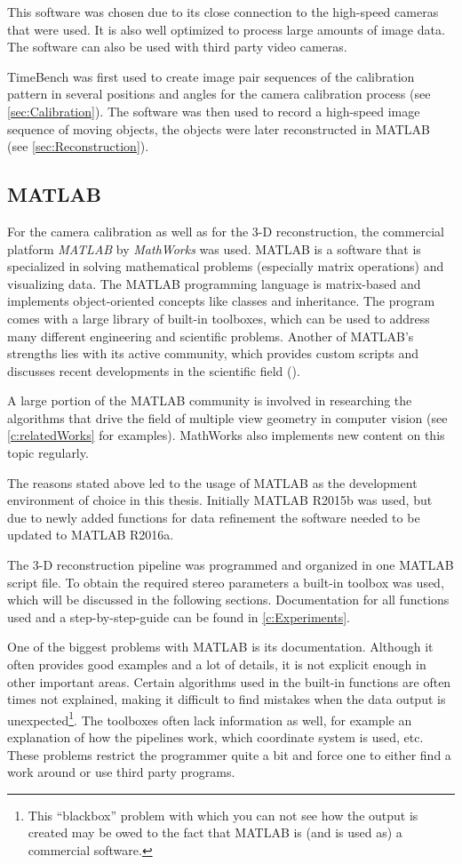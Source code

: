 This software was chosen due to its close connection to the high-speed cameras that were used. It is also well optimized to process large amounts of image data. The software can also be used with third party video cameras.

TimeBench was first used to create image pair sequences of the calibration pattern in several positions and angles for the camera calibration process (see \autoref{sec:Calibration}). The software was then used to record a high-speed image sequence of moving objects, the objects were later reconstructed in MATLAB (see \autoref{sec:Reconstruction}). 

\subsection{MATLAB} \label{ssec:Matlab}
For the camera calibration as well as for the 3-D reconstruction, the commercial platform \textit{MATLAB} by \textit{MathWorks} was used. MATLAB is a software that is specialized in solving mathematical problems (especially matrix operations) and visualizing data. The MATLAB programming language is matrix-based and implements object-oriented concepts like classes and inheritance. The program comes with a large library of built-in toolboxes, which can be used to address many different engineering and scientific problems. Another of MATLAB's strengths lies with its active community, which provides custom scripts and discusses recent developments in the scientific field (\cite{MathWorks.2016}).

A large portion of the MATLAB community is involved in researching the algorithms that drive the field of multiple view geometry in computer vision (see \autoref{c:relatedWorks} for examples). MathWorks also implements new content on this topic regularly. 

The reasons stated above led to the usage of MATLAB as the development environment of choice in this thesis. Initially MATLAB R2015b was used, but due to newly added functions for data refinement the software needed to be updated to MATLAB R2016a.
   
The 3-D reconstruction pipeline was programmed and organized in one MATLAB script file. To obtain the required stereo parameters a built-in toolbox was used, which will be discussed in the following sections. Documentation for all functions used and a step-by-step-guide can be found in \autoref{c:Experiments}.

One of the biggest problems with MATLAB is its documentation. Although it often provides good examples and a lot of details, it is not explicit enough in other important areas. Certain algorithms used in the built-in functions are often times not explained, making it difficult to find mistakes when the data output is unexpected\footnote{This \enquote{blackbox} problem with which you can not see how the output is created may be owed to the fact that MATLAB is (and is used as) a commercial software.}. The toolboxes often lack information as well, for example an explanation of how the pipelines work, which coordinate system is used, etc. These problems restrict the programmer quite a bit and force one to either find a work around or use third party programs. 

